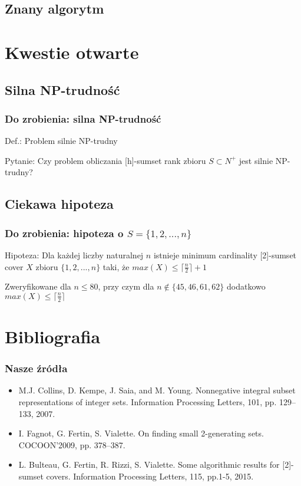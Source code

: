 \documentclass{beamer}
\begin{document}
	\subsection{Znany algorytm}
		\begin{frame}
		\end{frame}
		
\section{Kwestie otwarte}
	\subsection{Silna NP-trudność}
		\begin{frame} \frametitle{Do zrobienia: silna NP-trudność}
			Def.: Problem silnie NP-trudny
			
			Pytanie: Czy problem obliczania [h]-sumset rank zbioru $ S \subset N^{+} $ jest silnie NP-trudny?
		\end{frame}
		
	\subsection{Ciekawa hipoteza}
		\begin{frame} \frametitle{Do zrobienia: hipoteza o $ S = \lbrace 1,2,...,n \rbrace $}
			Hipoteza: Dla każdej liczby naturalnej $ n $ istnieje minimum cardinality [2]-sumset cover $ X $ zbioru $ \lbrace 1,2,...,n \rbrace $ taki, że $ max(X) \leq \lceil \frac{n}{2} \rceil + 1 $
			
			Zweryfikowane dla $ n \leq 80 $, przy czym dla $ n \notin \lbrace 45,46,61,62 \rbrace $ dodatkowo $ max(X) \leq \lceil \frac{n}{2} \rceil $
		\end{frame}

\section{Bibliografia}
	\begin{frame} \frametitle{Nasze źródła}
		\begin{itemize}
			\item M.J. Collins, D. Kempe, J. Saia, and M. Young. Nonnegative integral
subset representations of integer sets. Information Processing Letters, 101, pp. 129–133, 2007.
			\item I. Fagnot, G. Fertin, S. Vialette. On finding small 2-generating sets. COCOON'2009, pp. 378–387.
			\item L. Bulteau, G. Fertin, R. Rizzi, S. Vialette. Some algorithmic results
for [2]-sumset covers. Information Processing Letters, 115, pp.1-5, 2015.
		\end{itemize}
	\end{frame}
	
\end{document}
